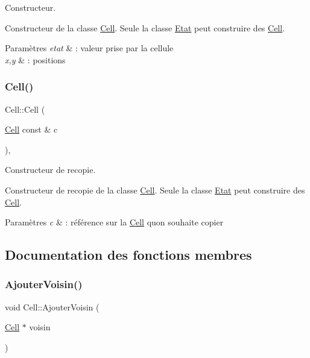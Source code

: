 Constructeur. 

Constructeur de la classe \mbox{\hyperlink{class_cell}{Cell}}. Seule la classe \mbox{\hyperlink{class_etat}{Etat}} peut construire des \mbox{\hyperlink{class_cell}{Cell}}.


\begin{DoxyParams}{Paramètres}
{\em etat} & \+: valeur prise par la cellule \\
\hline
{\em x,y} & \+: positions \\
\hline
\end{DoxyParams}
\mbox{\label{class_cell_aff4c807938a63e9469c1547e7c087e0b}} 
\subsubsection{\texorpdfstring{Cell()}{Cell()}\hspace{0.1cm}{\footnotesize\ttfamily [3/3]}}
{\footnotesize\ttfamily Cell\+::\+Cell (\begin{DoxyParamCaption}\item[{\mbox{\hyperlink{class_cell}{Cell}} const \&}]{c }\end{DoxyParamCaption})\hspace{0.3cm}{\ttfamily [private]}, {\ttfamily [default]}}



Constructeur de recopie. 

Constructeur de recopie de la classe \mbox{\hyperlink{class_cell}{Cell}}. Seule la classe \mbox{\hyperlink{class_etat}{Etat}} peut construire des \mbox{\hyperlink{class_cell}{Cell}}. 
\begin{DoxyParams}{Paramètres}
{\em c} & \+: référence sur la \mbox{\hyperlink{class_cell}{Cell}} qu\textquotesingle{}on souhaite copier \\
\hline
\end{DoxyParams}


\subsection{Documentation des fonctions membres}
\mbox{\label{class_cell_aef5912d85e2ca3e034023fb0874896fa}} 
\subsubsection{\texorpdfstring{Ajouter\+Voisin()}{AjouterVoisin()}}
{\footnotesize\ttfamily void Cell\+::\+Ajouter\+Voisin (\begin{DoxyParamCaption}\item[{\mbox{\hyperlink{class_cell}{Cell}} $\ast$}]{voisin }\end{DoxyParamCaption})}




